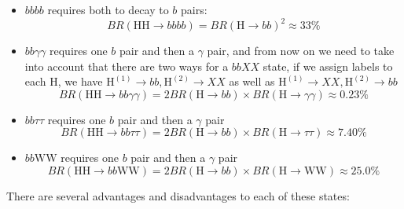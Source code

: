 \documentclass[12pt]{article}
\numberwithin{equation}{section}
\begin{document}
\begin{itemize}
\item $bbbb$ requires both to decay to $b$ pairs:
  \begin{equation}
    \label{eq:t121}
    \boxed{BR(\mathrm{HH}\to bbbb)=BR{(\mathrm{H}\to bb)}^2\approx33\%}
  \end{equation}
\item $bb\gamma\gamma$ requires one $b$ pair and then a $\gamma$ pair, and from now on we need to take into account that there are two ways for a $bbXX$ state, if we assign labels to each $\mathrm{H}$, we have $\mathrm{H}^{(1)}\to bb,\mathrm{H}^{(2)}\to XX$ as well as $\mathrm{H}^{(1)}\to XX,\mathrm{H}^{(2)}\to bb$
  \begin{equation}
    \label{eq:t122}
    \boxed{BR(\mathrm{HH}\to bb\gamma\gamma)=
      2BR(\mathrm{H}\to bb)\times BR(\mathrm{H}\to\gamma\gamma)\approx0.23\%}
  \end{equation}
\item $bb\tau\tau$ requires one $b$ pair and then a $\gamma$ pair
  \begin{equation}
    \label{eq:t123}
    \boxed{BR(\mathrm{HH}\to bb\tau\tau)=
      2BR(\mathrm{H}\to bb)\times BR(\mathrm{H}\to\tau\tau)\approx7.40\%}
  \end{equation}
\item $bb\mathrm{WW}$ requires one $b$ pair and then a $\gamma$ pair
  \begin{equation}
    \label{eq:t124}
    \boxed{BR(\mathrm{HH}\to bb\mathrm{WW})=
      2BR(\mathrm{H}\to bb)\times BR(\mathrm{H}\to\mathrm{WW})\approx25.0\%}
  \end{equation}
\end{itemize}
There are several advantages and disadvantages to each of these states:
\end{document}

